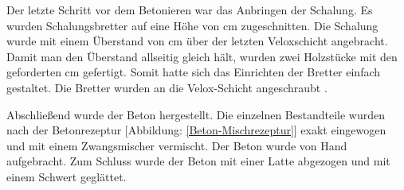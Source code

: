 Der letzte Schritt vor dem Betonieren war das Anbringen der Schalung. Es wurden Schalungsbretter auf eine Höhe von \unit[20]{cm} zugeschnitten. Die Schalung wurde mit einem Überstand von \unit[6]{cm} über der letzten Veloxschicht angebracht. Damit man den Überstand allseitig gleich hält, wurden zwei Holzstücke mit den geforderten \unit[6]{cm} gefertigt. Somit hatte sich das Einrichten der Bretter einfach gestaltet.  Die Bretter wurden an die Velox-Schicht angeschraubt .


Abschließend wurde der Beton hergestellt. Die einzelnen Bestandteile wurden nach der Betonrezeptur [Abbildung: \ref{Beton-Mischrezeptur}] exakt eingewogen und mit einem Zwangsmischer vermischt. Der Beton wurde von Hand aufgebracht. Zum Schluss wurde der Beton mit einer Latte abgezogen und mit einem Schwert geglättet.


	



